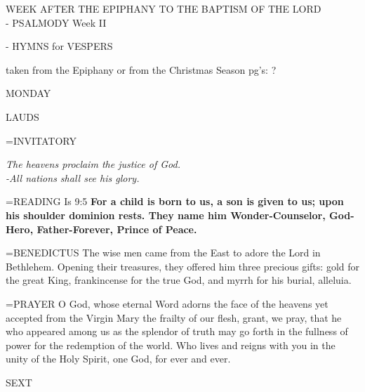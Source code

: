 \begin{center}\normalsize WEEK AFTER THE EPIPHANY TO THE BAPTISM OF THE LORD\\
\footnotesize - PSALMODY Week II\\
\begin{flushleft}\normalsize \footnotesize - HYMNS for VESPERS\\\end{flushleft} taken from the Epiphany or from the Christmas Season pg's: ?\\
\end{center}

\begin{center}
\normalsize MONDAY
\end{center}

\begin{flushleft}\normalsize LAUDS\\\end{flushleft}

\hangindent=\parindent \small{INVITATORY}
\begin{center}
\textit{The heavens proclaim the justice of God.\\}
\textit{-All nations shall see his glory.\\}
\end{center}

\hangindent=\parindent \small{\uppercase{READING}}    Is 9:5 \textbf{    For a child is born to us, a son is given to us; upon his shoulder dominion rests. They name him Wonder-Counselor, God-Hero, Father-Forever, Prince of Peace.\\}

\hangindent=\parindent \small{BENEDICTUS 	The wise men came from the East to adore the Lord in Bethlehem. Opening their treasures, they offered him three precious gifts: gold for the great King, frankincense for the true God, and myrrh for his burial, alleluia.\\}

\hangindent=\parindent \small{PRAYER 	O God, whose eternal Word adorns the face of the heavens yet accepted from the Virgin Mary the frailty of our flesh, grant, we pray, that he who appeared among us as the splendor of truth may go forth in the fullness of power for the redemption of the world. Who lives and reigns with you in the unity of the Holy Spirit, one God, for ever and ever.}

\begin{flushleft}\normalsize SEXT\\\end{flushleft}

